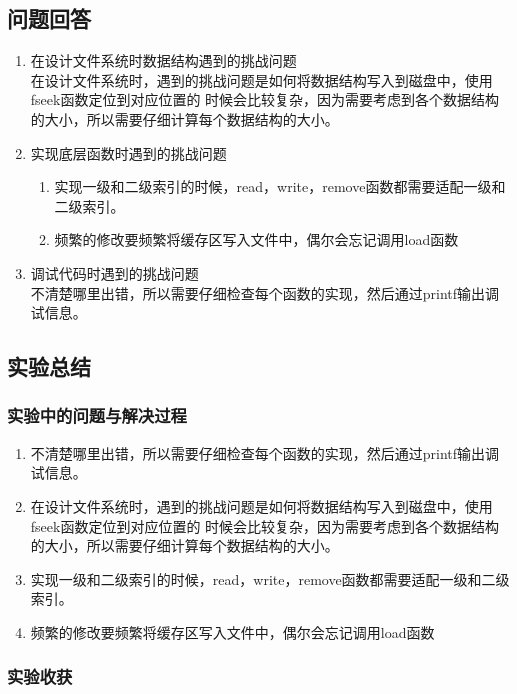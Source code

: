 \documentclass{article}
\begin{document}
    \subsection{问题回答}

    \begin{enumerate}
        \item 在设计文件系统时数据结构遇到的挑战问题 \\
        在设计文件系统时，遇到的挑战问题是如何将数据结构写入到磁盘中，使用fseek函数定位到对应位置的
        时候会比较复杂，因为需要考虑到各个数据结构的大小，所以需要仔细计算每个数据结构的大小。
        \item 实现底层函数时遇到的挑战问题
        \begin{enumerate}
            \item 实现一级和二级索引的时候，read，write，remove函数都需要适配一级和二级索引。
            \item 频繁的修改要频繁将缓存区写入文件中，偶尔会忘记调用load函数
        \end{enumerate}
        \item 调试代码时遇到的挑战问题\\
        不清楚哪里出错，所以需要仔细检查每个函数的实现，然后通过printf输出调试信息。
    \end{enumerate}

    \subsection{实验总结}
    \subsubsection{实验中的问题与解决过程}
    \begin{enumerate}
        \item 不清楚哪里出错，所以需要仔细检查每个函数的实现，然后通过printf输出调试信息。
        \item 在设计文件系统时，遇到的挑战问题是如何将数据结构写入到磁盘中，使用fseek函数定位到对应位置的
        时候会比较复杂，因为需要考虑到各个数据结构的大小，所以需要仔细计算每个数据结构的大小。
        \item 实现一级和二级索引的时候，read，write，remove函数都需要适配一级和二级索引。
        \item 频繁的修改要频繁将缓存区写入文件中，偶尔会忘记调用load函数
    \end{enumerate}
    \subsubsection{实验收获}
\end{document}
